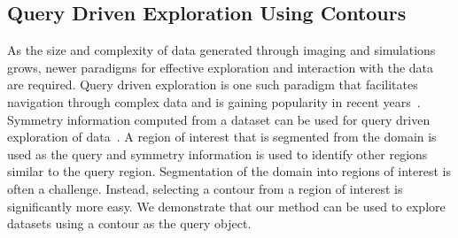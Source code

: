 \documentclass[review,journal]{vgtc}         %
\begin{document}
\subsection{Query Driven Exploration Using Contours}
As the size and complexity of data generated through imaging and simulations
grows, newer paradigms for effective exploration and interaction with
the data are required. Query driven exploration is one such paradigm that
facilitates navigation through complex data and is gaining popularity in recent
years~\cite{BeyerAKLPH13,LiuJH13}. Symmetry information computed from a dataset can be used for query
driven exploration of data~\cite{ThomN13,MasoodTN13}. A region of interest that is segmented from 
the domain is used as the query and symmetry information is used to identify
other regions similar to the query region. Segmentation of the domain into regions of interest
is often a challenge. Instead, selecting a contour from a region of interest is significantly
more easy. We demonstrate that our method can be used to explore datasets using a contour as
the query object.
\begin{figure*}[t]
\begin{minipage}{\textwidth}
	\centering
\end{minipage}
\begin{minipage}{\textwidth}
	\centering
\end{minipage}
\begin{minipage}{\textwidth}
	\centering
\end{minipage}
\end{figure*}
\end{document}

